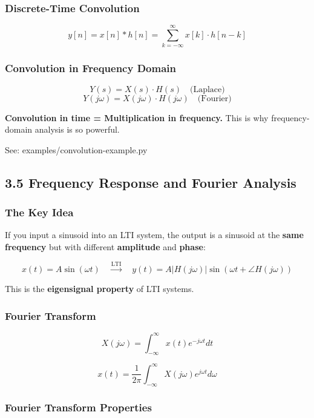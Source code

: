 \documentclass[11pt,a4paper]{book}
\begin{document}
\subsubsection{Discrete-Time Convolution}

\[y[n] = x[n] * h[n] = \sum_{k=-\infty}^{\infty} x[k] \cdot h[n - k]\]

\subsubsection{Convolution in Frequency Domain}

\[Y(s) = X(s) \cdot H(s) \quad \text{(Laplace)}\]
\[Y(j\omega) = X(j\omega) \cdot H(j\omega) \quad \text{(Fourier)}\]

\textbf{Convolution in time = Multiplication in frequency.} This is why frequency-domain analysis is so powerful.

See: examples/convolution-example.py

\medskip\noindent\hrulefill\medskip

\subsection{3.5 Frequency Response and Fourier Analysis}

\subsubsection{The Key Idea}

If you input a sinusoid into an LTI system, the output is a sinusoid at the \textbf{same frequency} but with different \textbf{amplitude} and \textbf{phase}:

\[x(t) = A\sin(\omega t) \quad \xrightarrow{\text{LTI}} \quad y(t) = A|H(j\omega)|\sin(\omega t + \angle H(j\omega))\]

This is the \textbf{eigensignal property} of LTI systems.

\subsubsection{Fourier Transform}

\[X(j\omega) = \int_{-\infty}^{\infty} x(t) e^{-j\omega t} dt\]

\[x(t) = \frac{1}{2\pi} \int_{-\infty}^{\infty} X(j\omega) e^{j\omega t} d\omega\]

\subsubsection{Fourier Transform Properties}
\end{document}
